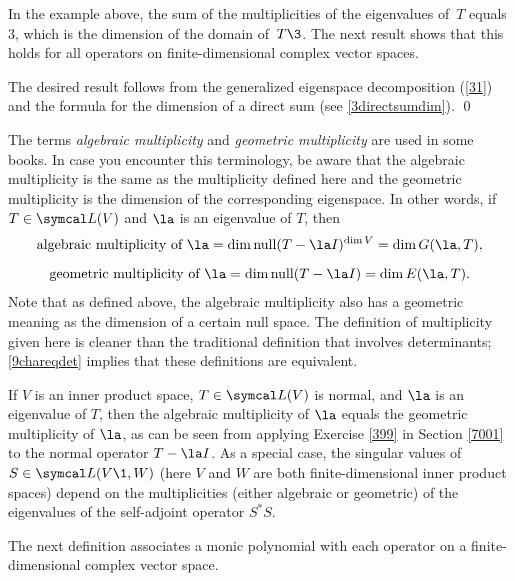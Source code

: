 In the example above, the sum of the multiplicities of the eigenvalues of~$T$ equals $3$, which is the dimension of the domain
of~$T\3$.  The next result shows that this holds for all operators on finite-dimensional complex vector spaces.


\proof
The desired result follows from the generalized eigenspace decomposition (\ref{31}) and the formula for the dimension of a direct sum (see \ref{3directsumdim}).
\qed

The terms \emph{algebraic multiplicity} and \emph{geometric \mbox{multiplicity}} are used in some books. In case you encounter this terminology, be aware that the algebraic multiplicity is the same as the multiplicity defined here and the geometric multiplicity is the dimension of the corresponding eigenspace. In other words, if $T \in \L(V)$ and $\la$ is an eigenvalue of $T$, then
\begin{gather*}
\text{algebraic multiplicity of\ }\la = \dim \ker(T - \la I)^{\dim V} = \dim G(\la, T),\\[6bp]
\text{geometric multiplicity of\ }\la = \dim \ker (T - \la I) = \dim E(\la, T).
\end{gather*}
Note that as defined above, the algebraic multiplicity also has a geometric meaning as the dimension of a certain null space. The definition of multiplicity given here is cleaner than the traditional definition that involves determinants; \ref{9chareqdet} implies that  these definitions are equivalent.

If $V$ is an inner product space, $T \in \L(V)$ is normal, and $\la$ is an eigenvalue of $T$, then the algebraic multiplicity of $\la$ equals the geometric multiplicity of $\la$, as can be seen from applying Exercise \ref{399} in Section \ref{7001} to the normal operator $T - \la I$. As a special case, the singular values of $S \in \L(V\1, W)$ (here $V$ and $W$ are both finite-dimensional inner product spaces) depend on the multiplicities (either algebraic or geometric) of the eigenvalues of the self-adjoint operator $S^* S$.

The next definition associates a monic polynomial with each operator on a finite-dimensional complex vector space.



